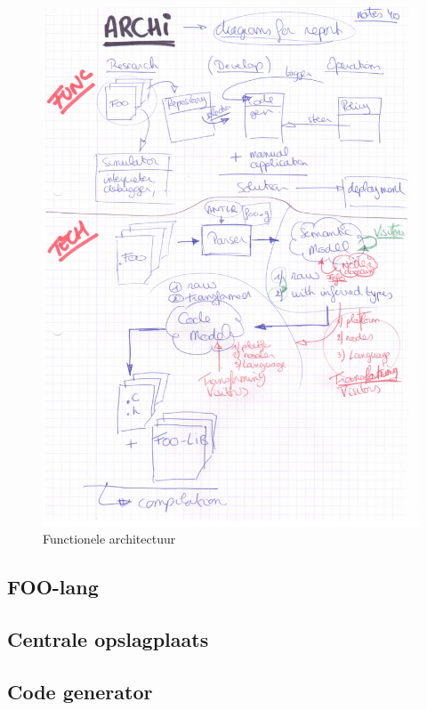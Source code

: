 \begin{figure}[ht]
  \centering
  \includegraphics[width=\linewidth]{resources/arch-functional.pdf}
  \caption{Functionele architectuur}
  \label{fig:arch-functional}
\end{figure}

\subsection{FOO-lang}
\label{subsection:arch-foo-lang}

\TODO

\subsection{Centrale opslagplaats}
\label{subsection:arch-repository}

\TODO

\subsection{Code generator}
\label{subsection:arch-codegen}


